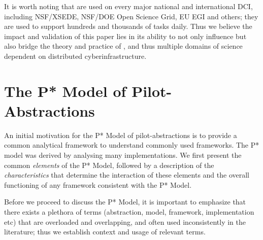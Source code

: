 \documentclass[conference]{IEEEtran}
\begin{document}
It is worth noting that \pilotjobs are used on every major national
and international DCI, including NSF/XSEDE, NSF/DOE Open Science Grid,
EU EGI and others; they are used to support hundreds and thousands of
tasks daily. Thus we believe the impact and validation of this paper
lies in its ability to not only influence but also bridge the theory
and practice of \pilotjobs, and thus multiple domains of science
dependent on distributed cyberinfrastructure.






\section{The P* Model of Pilot-\\Abstractions}
\label{sec:pilot-model}

An initial motivation for the P* Model of pilot-abstractions is to
provide a common analytical framework to understand commonly
used \pilotjob frameworks.  The P* model was derived by analysing many
\pilotjob implementations.  We first present
the common {\it elements} of the P* Model, followed by a description
of the {\it characteristics} that determine the interaction of these
elements and the overall functioning of any \pilotjob framework 
consistent with the P* Model.  

Before we proceed to discuss the P* Model, it is important to
emphasize that there exists a plethora of terms (abstraction,
model, framework, implementation etc) that are overloaded and
overlapping, and often used inconsistently in the literature;
thus we establish context and usage of relevant terms.
\end{document}
